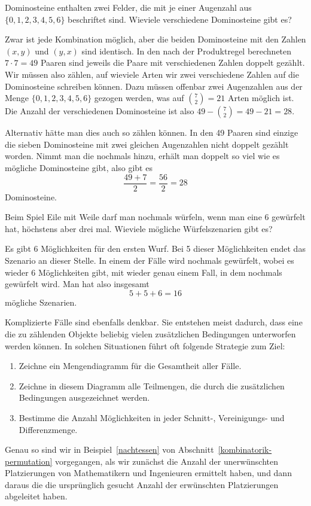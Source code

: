 \begin{beispiele}
\item Dominosteine enthalten zwei Felder, die mit je einer Augenzahl
aus $\{0,1,2,3,4,5,6\}$ beschriftet sind.
Wieviele verschiedene Dominosteine
gibt es?

\begin{loesung}
Zwar ist jede Kombination möglich, aber die beiden Dominosteine
mit den Zahlen $(x,y)$ und $(y,x)$ sind identisch.
In den nach der
Produktregel berechneten $7\cdot 7=49$ Paaren sind jeweils die Paare
mit verschiedenen Zahlen doppelt gezählt.
Wir müssen also zählen,
auf wieviele Arten wir zwei verschiedene Zahlen auf die Dominosteine
schreiben können.
Dazu müssen offenbar zwei Augenzahlen aus
der Menge $\{0,1,2,3,4,5,6\}$ gezogen werden, was auf 
$\binom{7}{2}=21$ Arten möglich ist.
Die Anzahl der verschiedenen
Dominosteine ist also $49 - \binom{7}{2}=49-21=28$.

Alternativ hätte man dies auch so zählen können.
In den 49 Paaren sind
einzige die sieben Dominosteine mit zwei gleichen Augenzahlen nicht doppelt
gezählt worden.
Nimmt man die nochmals hinzu, erhält man doppelt so viel
wie es mögliche Dominosteine gibt, also gibt es
\[
\frac{49+7}{2}=\frac{56}2=28
\]
Dominosteine.
\end{loesung}

\item Beim Spiel Eile mit Weile darf man nochmals würfeln, wenn
man eine 6 gewürfelt hat, höchstens aber drei mal.
Wieviele
mögliche Würfelszenarien gibt es?

\begin{loesung}
Es gibt 6 Möglichkeiten für den ersten Wurf.
Bei 5 dieser Möglichkeiten endet das Szenario an dieser Stelle.
In einem der
Fälle wird nochmals gewürfelt, wobei es wieder 6 Möglichkeiten
gibt, mit wieder genau einem Fall, in dem nochmals gewürfelt wird.
Man hat also insgesamt 
\[
5 + 5 + 6=16
\]
mögliche Szenarien.
\end{loesung}

\end{beispiele}

Komplizierte Fälle sind ebenfalls denkbar.
Sie entstehen meist dadurch, 
dass eine die zu zählenden Objekte beliebig vielen zusätzlichen
Bedingungen unterworfen werden können.
In solchen Situationen
führt oft folgende Strategie zum Ziel:
\begin{enumerate}
\item Zeichne ein Mengendiagramm für die Gesamtheit aller Fälle.
\item Zeichne in diesem Diagramm alle Teilmengen, die durch 
die zusätzlichen Bedingungen ausgezeichnet werden.
\item Bestimme die Anzahl Möglichkeiten in jeder Schnitt-, Vereinigungs-
und Differenzmenge.
\end{enumerate}
Genau so sind wir in Beispiel~\ref{nachtessen} von
Abschnitt~\ref{kombinatorik-permutation} vorgegangen,
als wir zunächst die Anzahl der unerwünschten Platzierungen
von Mathematikern und Ingenieuren ermittelt haben, und dann daraus
die die ursprünglich gesucht Anzahl der erwünschten Platzierungen
abgeleitet haben.


